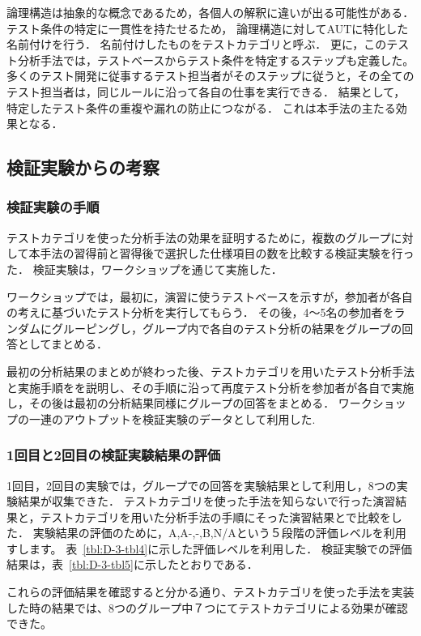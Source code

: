 \documentclass[a4paper,10pt]{jreport}
\begin{document}
論理構造は抽象的な概念であるため，各個人の解釈に違いが出る可能性がある．テスト条件の特定に一貫性を持たせるため， 論理構造に対してAUTに特化した名前付けを行う．
名前付けしたものをテストカテゴリと呼ぶ．
更に，このテスト分析手法では，テストベースからテスト条件を特定するステップも定義した。
多くのテスト開発に従事するテスト担当者がそのステップに従うと，その全てのテスト担当者は，同じルールに沿って各自の仕事を実行できる．
結果として，特定したテスト条件の重複や漏れの防止につながる．
これは本手法の主たる効果となる．
\subsection{検証実験からの考察}
\subsubsection{検証実験の手順}
テストカテゴリを使った分析手法の効果を証明するために，複数のグループに対して本手法の習得前と習得後で選択した仕様項目の数を比較する検証実験を行った．
検証実験は，ワークショップを通じて実施した．

ワークショップでは，最初に，演習に使うテストベースを示すが，参加者が各自の考えに基づいたテスト分析を実行してもらう．
その後，4〜5名の参加者をランダムにグルーピングし，グループ内で各自のテスト分析の結果をグループの回答としてまとめる．

最初の分析結果のまとめが終わった後、テストカテゴリを用いたテスト分析手法と実施手順をを説明し、その手順に沿って再度テスト分析を参加者が各自で実施し，その後は最初の分析結果同様にグループの回答をまとめる．
ワークショップの一連のアウトプットを検証実験のデータとして利用した.
\subsubsection{1回目と2回目の検証実験結果の評価}
1回目，2回目の実験では，グループでの回答を実験結果として利用し，8つの実験結果が収集できた．
テストカテゴリを使った手法を知らないで行った演習結果と，テストカテゴリを用いた分析手法の手順にそった演習結果とで比較をした．
実験結果の評価のために，A,A-,-,B,N/Aという５段階の評価レベルを利用すします。
表~\ref{tbl:D-3-tbl4}に示した評価レベルを利用した．
検証実験での評価結果は，表~\ref{tbl:D-3-tbl5}に示したとおりである．

これらの評価結果を確認すると分かる通り、テストカテゴリを使った手法を実装した時の結果では、8つのグループ中７つにてテストカテゴリによる効果が確認できた。
\end{document}
